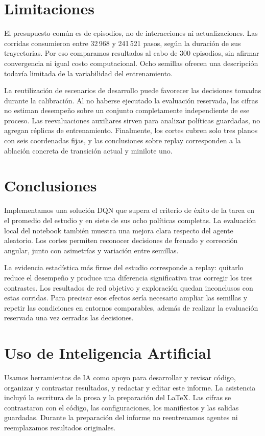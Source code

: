 \documentclass[conference]{IEEEtran}
\begin{document}
\section{Limitaciones}
El presupuesto común es de episodios, no de interacciones ni actualizaciones. Las corridas consumieron entre 32\,968 y 241\,521 pasos, según la duración de sus trayectorias. Por eso comparamos resultados al cabo de 300 episodios, sin afirmar convergencia ni igual costo computacional. Ocho semillas ofrecen una descripción todavía limitada de la variabilidad del entrenamiento.

La reutilización de escenarios de desarrollo puede favorecer las decisiones tomadas durante la calibración. Al no haberse ejecutado la evaluación reservada, las cifras no estiman desempeño sobre un conjunto completamente independiente de ese proceso. Las reevaluaciones auxiliares sirven para analizar políticas guardadas, no agregan réplicas de entrenamiento. Finalmente, los cortes cubren solo tres planos con seis coordenadas fijas, y las conclusiones sobre replay corresponden a la ablación concreta de transición actual y minilote uno.

\section{Conclusiones}
Implementamos una solución DQN que supera el criterio de éxito de la tarea en el promedio del estudio y en siete de sus ocho políticas completas. La evaluación local del notebook también muestra una mejora clara respecto del agente aleatorio. Los cortes permiten reconocer decisiones de frenado y corrección angular, junto con asimetrías y variación entre semillas.

La evidencia estadística más firme del estudio corresponde a replay: quitarlo reduce el desempeño y produce una diferencia significativa tras corregir los tres contrastes. Los resultados de red objetivo y exploración quedan inconclusos con estas corridas. Para precisar esos efectos sería necesario ampliar las semillas y repetir las condiciones en entornos comparables, además de realizar la evaluación reservada una vez cerradas las decisiones.

\section*{Uso de Inteligencia Artificial}
Usamos herramientas de IA como apoyo para desarrollar y revisar código, organizar y contrastar resultados, y redactar y editar este informe. La asistencia incluyó la escritura de la prosa y la preparación del LaTeX. Las cifras se contrastaron con el código, las configuraciones, los manifiestos y las salidas guardadas. Durante la preparación del informe no reentrenamos agentes ni reemplazamos resultados originales.
\end{document}
